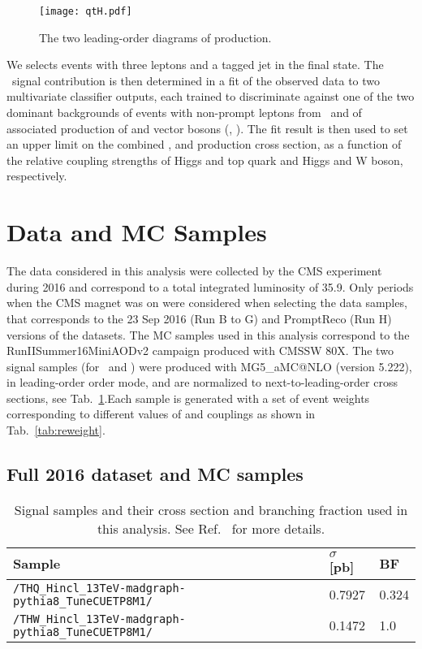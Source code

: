 \begin{figure}[!htb]
\begin{center}
\texttt{[image: qtH.pdf]}
\end{center}
\caption[The two leading-order diagrams of \tHq production.]{The two leading-order diagrams of \tHq production.}
\label{fig:thq_prod}
\end{figure}

\noindent We selects events with three leptons and a \bjet tagged jet in the final state. The \tHq \ signal contribution is then determined in a fit of the observed data to two multivariate classifier outputs, each trained to discriminate against one of the two dominant backgrounds of events with non-prompt leptons from \ttbar\ and of associated production of \ttbar and vector bosons (\ttW, \ttZ). The fit result is then used to set an upper limit on the combined \ttH, \tHq and \tHW production cross section, as a function of the relative coupling strengths of Higgs and top quark and Higgs and W boson, respectively.

\section{Data and MC Samples}
\label{secc:samples}

The data considered in this analysis were collected by the CMS experiment during 2016 and correspond to a total integrated luminosity of 35.9\fbinv. Only periods when the CMS magnet was on were considered when selecting the data samples, that corresponds to the 23 Sep 2016 (Run B to G) and PromptReco (Run H) versions of the datasets. The MC samples used in this analysis correspond to the RunIISummer16MiniAODv2 campaign produced with CMSSW 80X. The two signal samples (for \tHq\ and \tHW) were produced with \textsc{MG5\_}a\textsc{MC@NLO} (version 5.222), in leading-order order mode, and are normalized to next-to-leading-order cross sections, see Tab.~\ref{tab:sigsamples}.Each sample is generated with a set of event weights corresponding to different values of \Ct and \CV couplings as shown in Tab.~\ref{tab:reweight}.

\subsection{Full 2016 dataset and MC samples}
\begin{table}[ht!]
\centering \small
\begin{tabular}{lll}
Sample & $\sigma$ [pb] & BF \\ \hline
\verb|/THQ_Hincl_13TeV-madgraph-pythia8_TuneCUETP8M1/| & 0.7927 & 0.324 \\
\verb|/THW_Hincl_13TeV-madgraph-pythia8_TuneCUETP8M1/| & 0.1472 & 1.0   \\\hline
\end{tabular}
\caption[Signal samples and their cross section and branching fraction.]{Signal samples and their cross section and branching fraction used in this analysis. See Ref.~\cite{THQProdTwiki} for more details.}\label{tab:sigsamples}
\end{table}


